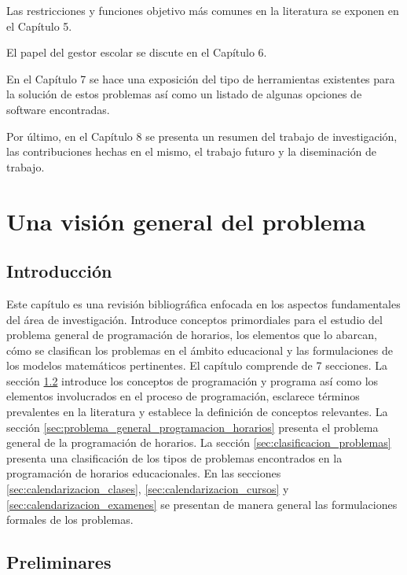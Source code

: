 \documentclass[draft,12pt,headsepline,footsepline,paper=letter]{scrreprt}
\begin{document}
Las restricciones y funciones objetivo más comunes en la literatura se exponen en el Capítulo 5.

El papel del gestor escolar se discute en el Capítulo 6.

En el Capítulo 7 se hace una exposición del tipo de herramientas existentes para la solución de estos problemas así como un listado de algunas opciones de software encontradas.

Por último, en el Capítulo 8 se presenta un resumen del trabajo de investigación, las contribuciones hechas en el mismo, el trabajo futuro y la diseminación de trabajo.

\chapter{Una visión general del problema}

\section{Introducción}

Este capítulo es una revisión bibliográfica enfocada en los aspectos fundamentales del área de investigación.
Introduce conceptos primordiales para el estudio del problema general de programación de horarios, los elementos que lo abarcan, cómo se clasifican los problemas en el ámbito educacional y las formulaciones de los modelos matemáticos pertinentes.
El capítulo comprende de 7 secciones. La sección \ref{sec:preliminares} introduce los conceptos de programación y programa así como los elementos involucrados en el proceso de programación, esclarece términos prevalentes en la literatura y establece la definición de conceptos relevantes. La sección \ref{sec:problema_general_programacion_horarios} presenta el problema general de la programación de horarios. La sección \ref{sec:clasificacion_problemas} presenta una clasificación de los tipos de problemas encontrados en la programación de horarios educacionales. En las secciones \ref{sec:calendarizacion_clases}, \ref{sec:calendarizacion_cursos} y \ref{sec:calendarizacion_examenes} se presentan de manera general las formulaciones formales de los problemas.

\section{Preliminares}
\label{sec:preliminares}
\end{document}
